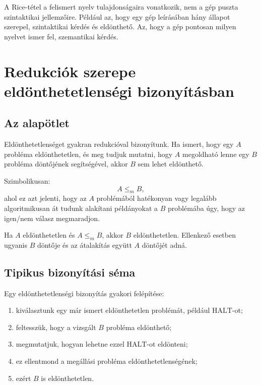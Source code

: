 \begin{warningbox}
A Rice-tétel a felismert nyelv tulajdonságaira vonatkozik, nem a gép puszta szintaktikai jellemzőire. Például az, hogy egy gép leírásában hány állapot szerepel, szintaktikai kérdés és eldönthető. Az, hogy a gép pontosan milyen nyelvet ismer fel, szemantikai kérdés.
\end{warningbox}

\section{Redukciók szerepe eldönthetetlenségi bizonyításban}

\subsection{Az alapötlet}

Eldönthetetlenséget gyakran redukcióval bizonyítunk. Ha ismert, hogy egy $A$ probléma eldönthetetlen, és meg tudjuk mutatni, hogy $A$ megoldható lenne egy $B$ probléma döntőjének segítségével, akkor $B$ sem lehet eldönthető.

Szimbolikusan:
\[
  A \leq_m B,
\]
ahol ez azt jelenti, hogy az $A$ problémából hatékonyan vagy legalább algoritmikusan át tudunk alakítani példányokat a $B$ problémába úgy, hogy az igen/nem válasz megmaradjon.

Ha $A$ eldönthetetlen és $A\leq_m B$, akkor $B$ eldönthetetlen. Ellenkező esetben ugyanis $B$ döntője és az átalakítás együtt $A$ döntőjét adná.

\subsection{Tipikus bizonyítási séma}

Egy eldönthetetlenségi bizonyítás gyakori felépítése:

\begin{enumerate}
  \item kiválasztunk egy már ismert eldönthetetlen problémát, például $\mathrm{HALT}$-ot;
  \item feltesszük, hogy a vizsgált $B$ probléma eldönthető;
  \item megmutatjuk, hogyan lehetne ezzel $\mathrm{HALT}$-ot eldönteni;
  \item ez ellentmond a megállási probléma eldönthetetlenségének;
  \item ezért $B$ is eldönthetetlen.
\end{enumerate}

